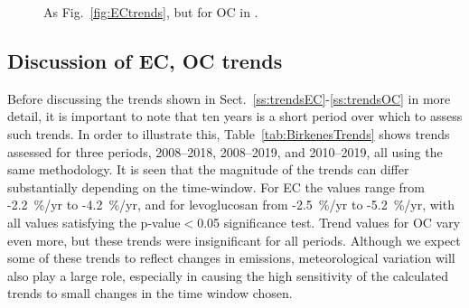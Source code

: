 \begin{figure}  %
\caption{As Fig.~\ref{fig:ECtrends}, but for OC in \pmfine.
\label{fig:OCtrends}}
\end{figure}

\subsection{Discussion of EC, OC trends}
\label{ss:DiscECOC}

Before discussing the trends shown in Sect.~\ref{ss:trendsEC}-\ref{ss:trendsOC} in  more detail, it is important to note that ten years is a short period over which to assess such trends. In order to illustrate this, Table~\ref{tab:BirkenesTrends} shows trends assessed for three periods, 2008--2018, 2008--2019, and 2010--2019, all using the same methodology. It is seen that the magnitude of the trends can differ substantially depending on the time-window. For EC the values range from -2.2~\%/yr to \mbox{-4.2~\%/yr}, and for levoglucosan from -2.5~\%/yr to -5.2~\%/yr, with all values satisfying the p-value$<$0.05 significance test. Trend values for OC vary even more, but these trends were insignificant for all periods. Although we expect some of these trends to reflect changes in emissions, meteorological variation will also play a large role, especially in causing the high sensitivity of the calculated trends to small changes in the time window chosen.

